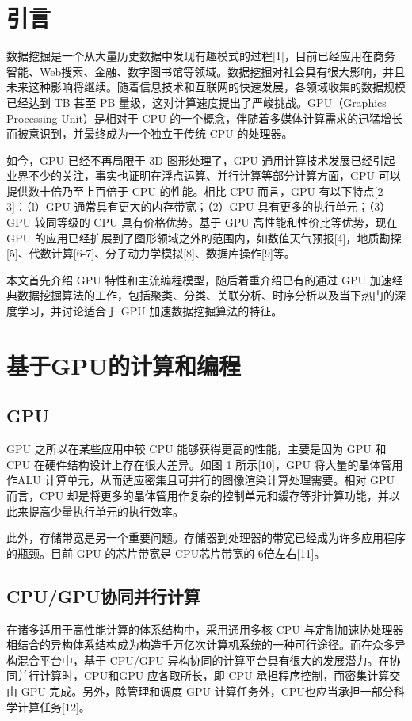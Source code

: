 \documentclass{article}
\begin{document}
    \begin{multicols}{2}

    \section{引言}
    数据挖掘是一个从大量历史数据中发现有趣模式的过程[1]，目前已经应用在商务智能、Web搜索、金融、数字图书馆等领域。数据挖掘对社会具有很大影响，并且未来这种影响将继续。随着信息技术和互联网的快速发展，各领域收集的数据规模已经达到 TB 甚至 PB 量级，这对计算速度提出了严峻挑战。GPU（Graphics Processing Unit）是相对于 CPU 的一个概念，伴随着多媒体计算需求的迅猛增长而被意识到，并最终成为一个独立于传统 CPU 的处理器。
    
    如今，GPU 已经不再局限于 3D 图形处理了，GPU 通用计算技术发展已经引起业界不少的关注，事实也证明在浮点运算、并行计算等部分计算方面，GPU 可以提供数十倍乃至上百倍于 CPU 的性能。相比 CPU 而言，GPU 有以下特点[2-3]：（l）GPU 通常具有更大的内存带宽；（2）GPU 具有更多的执行单元；（3）GPU 较同等级的 CPU 具有价格优势。基于 GPU 高性能和性价比等优势，现在 GPU 的应用已经扩展到了图形领域之外的范围内，如数值天气预报[4]，地质勘探[5]、代数计算[6-7]、分子动力学模拟[8]、数据库操作[9]等。

    本文首先介绍 GPU 特性和主流编程模型，随后着重介绍已有的通过 GPU 加速经典数据挖掘算法的工作，包括聚类、分类、关联分析、时序分析以及当下热门的深度学习，并讨论适合于 GPU 加速数据挖掘算法的特征。

    \section{基于GPU的计算和编程}
    \subsection{GPU}
    GPU 之所以在某些应用中较 CPU 能够获得更高的性能，主要是因为 GPU 和 CPU 在硬件结构设计上存在很大差异。如图 1 所示[10]，GPU 将大量的晶体管用作ALU 计算单元，从而适应密集且可并行的图像渲染计算处理需要。相对 GPU 而言，CPU 却是将更多的晶体管用作复杂的控制单元和缓存等非计算功能，并以此来提高少量执行单元的执行效率。

    此外，存储带宽是另一个重要问题。存储器到处理器的带宽已经成为许多应用程序的瓶颈。目前 GPU 的芯片带宽是 CPU芯片带宽的 6倍左右[11]。
    
    \subsection{CPU/GPU协同并行计算}
    在诸多适用于高性能计算的体系结构中，采用通用多核 CPU 与定制加速协处理器相结合的异构体系结构成为构造千万亿次计算机系统的一种可行途径。而在众多异构混合平台中，基于 CPU/GPU 异构协同的计算平台具有很大的发展潜力。在协同并行计算时，CPU和GPU 应各取所长，即 CPU 承担程序控制，而密集计算交由 GPU 完成。另外，除管理和调度 GPU 计算任务外，CPU也应当承担一部分科学计算任务[12]。
    

\end{multicols}
\end{document}
